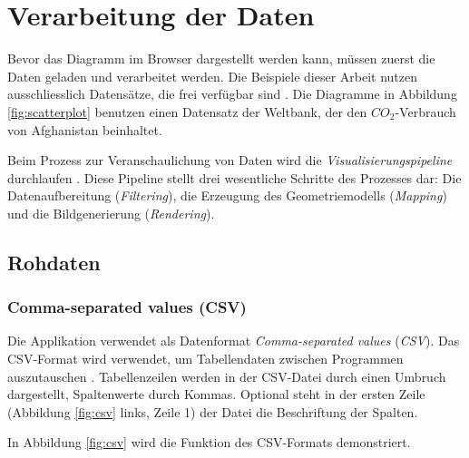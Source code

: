 \section{Verarbeitung der Daten}

Bevor das Diagramm im Browser dargestellt werden kann, müssen zuerst die Daten geladen und verarbeitet werden. Die Beispiele dieser Arbeit nutzen ausschliesslich Datensätze, die frei verfügbar sind \cite{worldbank}.  %
Die Diagramme in Abbildung \ref{fig:scatterplot} benutzen einen Datensatz der Weltbank, der den $CO_2$-Verbrauch von Afghanistan beinhaltet.


Beim Prozess zur Veranschaulichung von Daten wird die \textit{Visualisierungspipeline} durchlaufen \cite{viz}. Diese Pipeline stellt drei wesentliche Schritte des Prozesses dar: Die Datenaufbereitung (\textit{Filtering}), die Erzeugung des Geometriemodells (\textit{Mapping}) und die Bildgenerierung (\textit{Rendering}).

\subsection{Rohdaten}

\subsubsection{Comma-separated values (CSV)}

Die Applikation verwendet als Datenformat \textit{Comma-separated values} (\textit{CSV}). Das CSV-Format wird verwendet, um Tabellendaten zwischen Programmen auszutauschen \cite{csv}. Tabellenzeilen werden in der CSV-Datei durch einen Umbruch dargestellt, Spaltenwerte durch Kommas. Optional steht in der ersten Zeile (Abbildung \ref{fig:csv} links, Zeile 1) der Datei die Beschriftung der Spalten.

In Abbildung \ref{fig:csv} wird die Funktion des CSV-Formats demonstriert.

